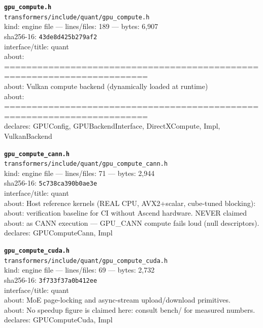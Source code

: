 \noindent\textbf{\texttt{gpu\_compute.h}}\\
\texttt{transformers/include/quant/gpu\_compute.h}\\
kind: engine file --- lines/files: 189 --- bytes: 6,907\\
sha256-16: \texttt{43de8d425b279af2}\\
interface/title: quant\\
about: ========================================================================\\
about: Vulkan compute backend (dynamically loaded at runtime)\\
about: ========================================================================\\
declares: GPUConfig, GPUBackendInterface, DirectXCompute, Impl, VulkanBackend\\
\vspace*{6.0pt}

\noindent\textbf{\texttt{gpu\_compute\_cann.h}}\\
\texttt{transformers/include/quant/gpu\_compute\_cann.h}\\
kind: engine file --- lines/files: 71 --- bytes: 2,944\\
sha256-16: \texttt{5c738ca390b0ae3e}\\
interface/title: quant\\
about: Host reference kernels (REAL CPU, AVX2+scalar, cube-tuned blocking):\\
about: verification baseline for CI without Ascend hardware. NEVER claimed\\
about: as CANN execution — GPU\_CANN compute fails loud (null descriptors).\\
declares: GPUComputeCann, Impl\\
\vspace*{6.0pt}
\newpage

\noindent\textbf{\texttt{gpu\_compute\_cuda.h}}\\
\texttt{transformers/include/quant/gpu\_compute\_cuda.h}\\
kind: engine file --- lines/files: 69 --- bytes: 2,732\\
sha256-16: \texttt{3f733f37a0b412ee}\\
interface/title: quant\\
about: MoE page-locking and async-stream upload/download primitives.\\
about: No speedup figure is claimed here: consult bench/ for measured numbers.\\
declares: GPUComputeCuda, Impl\\
\vspace*{6.0pt}

